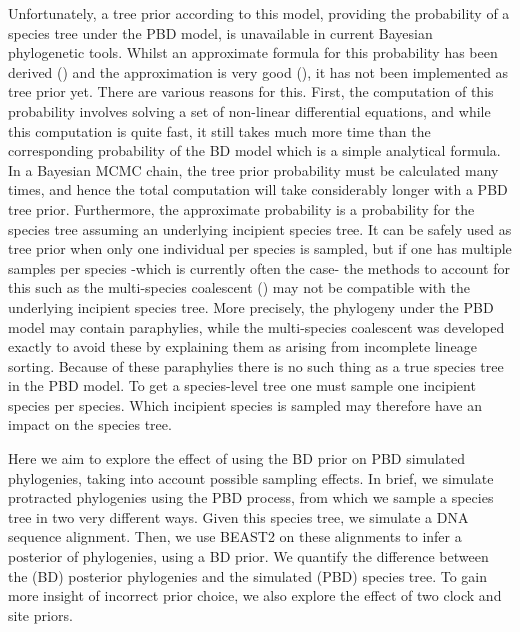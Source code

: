 \documentclass{article}
\begin{document}
Unfortunately, a tree prior according to this model, 
providing the probability of a species tree under the PBD model, 
is unavailable in current Bayesian phylogenetic tools. 
Whilst an approximate formula for this probability has been derived (\cite{lambert_et_al_2015}) 
and the approximation is very good (\cite{simonet_et_al_2018}), 
it has not been implemented as tree prior yet. 
There are various reasons for this. 
First, the computation of this probability involves solving a set of 
non-linear differential equations, and while this computation is quite fast, 
it still takes much more time than the corresponding probability 
of the BD model which is a simple analytical formula. 
In a Bayesian MCMC chain, the tree prior probability must be calculated many times, 
and hence the total computation will take considerably longer with a PBD tree prior. 
Furthermore, the approximate probability is a probability for the species tree 
assuming an underlying incipient species tree. 
It can be safely used as tree prior when only one individual per species is sampled, 
but if one has multiple samples per species -which is currently often the case- the methods 
to account for this such as the multi-species coalescent (\cite{heled_and_drummond_2009}) 
may not be compatible with the underlying incipient species tree. 
More precisely, the phylogeny under the PBD model may contain paraphylies, 
while the multi-species coalescent was developed exactly to avoid 
these by explaining them as arising from incomplete lineage sorting. 
Because of these paraphylies there is no such thing as a true species tree in the PBD model. 
To get a species-level tree one must sample one incipient species per species. 
Which incipient species is sampled may therefore have an impact on the species tree.

Here we aim to explore the effect of using the
BD prior on PBD simulated phylogenies, taking into account possible sampling effects.
In brief, we simulate protracted phylogenies using the PBD process,
from which we sample a species tree in two very different ways. Given this species tree, 
we simulate a DNA sequence alignment. Then, we use BEAST2 on these alignments
to infer a posterior of phylogenies, using a BD prior. We quantify the difference
between the (BD) posterior phylogenies and the simulated (PBD) species tree.
To gain more insight of incorrect prior choice, we also explore the effect of 
two clock and site priors.

\end{document}
